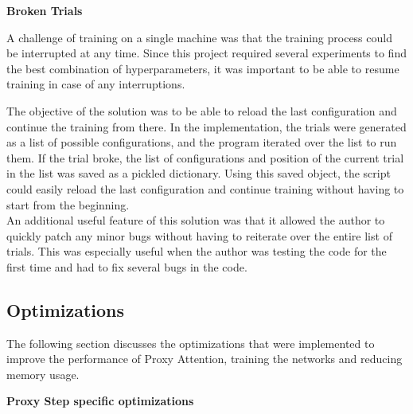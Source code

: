 \documentclass[a4paper,11pt,openright]{book}
\begin{document}
\textbf{Broken Trials}

A challenge of training on a single machine was that the training process could be interrupted at any time. Since this project required several experiments to find the best combination of hyperparameters, it was important to be able to resume training in case of any interruptions. 

The objective of the solution was to be able to reload the last configuration and continue the training from there. In the implementation, the trials were generated as a list of possible configurations, and the program iterated over the list to run them. If the trial broke, the list of configurations and position of the current trial in the list was saved as a pickled dictionary. Using this saved object, the script could easily reload the last configuration and continue training without having to start from the beginning.\\
An additional useful feature of this solution was that it allowed the author to quickly patch any minor bugs without having to reiterate over the entire list of trials. This was especially useful when the author was testing the code for the first time and had to fix several bugs in the code.

\subsection{Optimizations}
The following section discusses the optimizations that were implemented to improve the performance of Proxy Attention, training the networks and reducing memory usage.

\textbf{Proxy Step specific optimizations}
\end{document}
